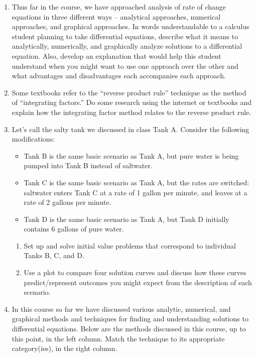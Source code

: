 \begin{enumerate}
\item	Thus far in the course, we have approached analysis of rate of change equations in three different ways -- analytical approaches, numerical approaches, and graphical approaches. In words understandable to a calculus student planning to take differential equations, describe what it means to analytically, numerically, and graphically analyze solutions to a differential equation. Also, develop an explanation that would help this student understand when you might want to use one approach over the other and what advantages and disadvantages each accompanies each approach. \label{04HWproblem7}

\item	Some textbooks refer to the ``reverse product rule'' technique as the method of ``integrating factors.'' Do some research using the internet or textbooks and explain how the integrating factor method relates to the reverse product rule. \label{04HWproblem8}

\item Let's call the salty tank we discussed in class Tank A. \label{04HWproblem9} Consider the following modifications:
\begin{itemize}
\item Tank B is the same basic scenario as Tank A, but pure water is being pumped into Tank B instead of saltwater.
\item Tank C is the same  basic scenario as Tank A, but the rates are switched: saltwater enters Tank C at a rate of 1 gallon per minute, and leaves at a rate of 2 gallons per minute.
\item Tank D is the same  basic scenario as Tank A, but Tank D initially contains 6 gallons of pure water.
\end{itemize}
\begin{enumerate}
\item Set up and solve initial value problems that correspond to individual Tanks B, C, and D.
\item Use a plot to compare four solution curves and discuss how these curves predict/represent outcomes you might expect from the description of each scenario. 
\end{enumerate}

\item In this course so far we have discussed various analytic, numerical, and graphical methods and techniques for finding and understanding solutions to differential equations. Below are the methods discussed in this course, up to this point, in the left column. Match the technique to its appropriate category(ies), in the right column. \label{04HWproblem10}


\end{enumerate}
